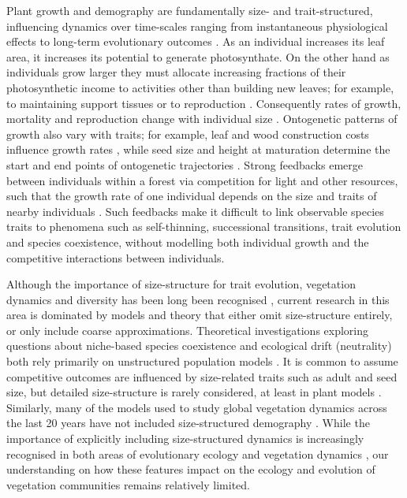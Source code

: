 \documentclass[a4paper,11pt]{article}
\begin{document}
Plant growth and demography are fundamentally size- and
trait-structured, influencing dynamics over time-scales ranging from
instantaneous physiological effects to long-term evolutionary outcomes
\citep{Harper-1977, Westoby-2002}.
%
As an individual increases its leaf area, it increases its potential
to generate photosynthate.
%
On the other hand as individuals grow larger they must allocate increasing
fractions of their photosynthetic income to activities other
than building new leaves; for example, to maintaining support tissues
\citep{Givnish-1988, Enquist-2007} or to reproduction
\citep{Thomas-2011}.
%
Consequently rates of growth, mortality and reproduction change with
individual size \citep{Muller-2006, Ruger-2011, Thomas-2011}.
Ontogenetic
patterns of growth also vary with traits; for example,
leaf and wood construction costs influence growth rates
\citep{Wright-2010}, while seed size and height
at maturation determine the start and end points of ontogenetic
trajectories \citep{Westoby-2002}.
%
Strong feedbacks emerge between individuals within a forest via
competition for light and other resources, such that the growth rate
of one individual depends on the size and traits of nearby
individuals \citep{Shugart-1980, Pacala-1996}.
%
Such feedbacks make it difficult to link observable species traits to
phenomena such as self-thinning, successional transitions, trait
evolution and species coexistence, without
modelling both individual growth and the competitive interactions between
individuals.

Although the importance of size-structure for trait evolution, vegetation
dynamics and diversity has been long been recognised \citep[e.g.,][]{Harper-1977,
  Shugart-1980, Huston-1987}, current research in this area is
dominated by models and theory that either omit size-structure
entirely, or only include coarse approximations.
%
Theoretical investigations exploring questions about niche-based
species coexistence and ecological drift (neutrality) both rely
primarily on unstructured population models \citep[e.g.][]{MacArthur-1967,
  Tilman-1985, Geritz-1998, Hubbell-2001, Calcagno-2006}.
%
It is common to assume competitive outcomes are influenced by
size-related traits such as adult and seed size, but detailed
size-structure is rarely considered, at least in plant models
\cite[for animal examples, see][]{Deroos-1988, Deroos-1992}.
%
Similarly, many of the models used to study global vegetation dynamics across
the last 20 years have not included size-structured demography
\citep[for comparisons of some major models see][]{Sitch-2008,
Dekauwe-2014}.
%
While the importance of explicitly including size-structured dynamics is
increasingly recognised in both areas of evolutionary ecology
\citep[e.g.][]{Falster-2015} and vegetation dynamics
\citep[e.g.][]{Moorcroft-2001, Purves-2008, Smith-2014,
Weng-2015, Sakschewski-2015}, our understanding on how these features
impact on the ecology and evolution of vegetation communities remains
relatively limited.
\end{document}
